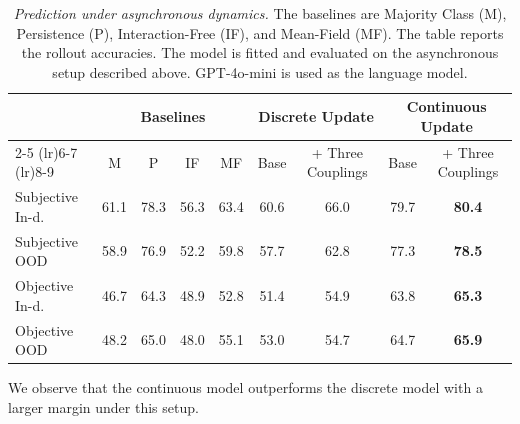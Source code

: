 \begin{table}[h]
\centering
\small
\begin{tabular}{l cccc cc cc}
\toprule
& \multicolumn{4}{c}{Baselines}
& \multicolumn{2}{c}{Discrete Update}
& \multicolumn{2}{c}{Continuous Update} \\
\cmidrule(lr){2-5} \cmidrule(lr){6-7} \cmidrule(lr){8-9}
& M & P & IF & MF
& Base & + Three Couplings
& Base & + Three Couplings \\
\midrule
Subjective In-d.  & 61.1 & 78.3 & 56.3 & 63.4 & 60.6 & 66.0 & 79.7 & \textbf{80.4} \\
Subjective OOD    & 58.9 & 76.9 & 52.2 & 59.8 & 57.7 & 62.8 & 77.3 & \textbf{78.5} \\
Objective In-d.   & 46.7 & 64.3 & 48.9 & 52.8 & 51.4 & 54.9 & 63.8 & \textbf{65.3} \\
Objective OOD     & 48.2 & 65.0 & 48.0 & 55.1 & 53.0 & 54.7 & 64.7 & \textbf{65.9} \\
\bottomrule
\end{tabular}
\caption{\textit{Prediction under asynchronous dynamics.} The baselines are Majority Class (M), Persistence (P), Interaction-Free (IF), and Mean-Field (MF). The table reports the rollout accuracies. The model is fitted and evaluated on the asynchronous setup described above. GPT-4o-mini is used as the language model. \label{tab:async}}
\end{table}



We observe that the continuous model outperforms the discrete model with a larger margin under this setup. 
